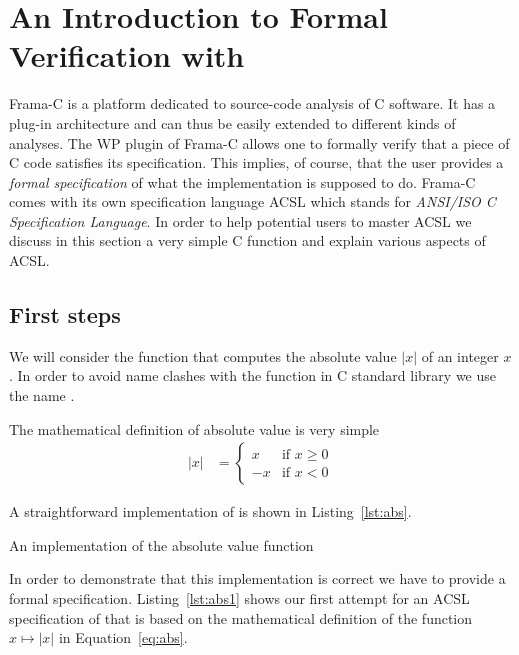 
\section{An Introduction to Formal Verification with \framacwp}
\label{sec:frama-c}

Frama-C is a platform dedicated to source-code analysis of C software.
It has a plug-in architecture and can thus be easily extended to 
different kinds of analyses.
The WP plugin of Frama-C allows one to formally verify that a piece of
C code satisfies its specification.
This implies, of course, that the user provides a \emph{formal specification}
of what the implementation is supposed to do.
Frama-C comes with its own specification language ACSL which stands for
\emph{ANSI\slash ISO C Specification Language}.
In order to help potential users to master ACSL we discuss in this section 
a very simple C function and explain various aspects of ACSL.

\subsection{First steps}

We will consider the function that computes the absolute value $|x|$
of an integer $x$.
In order to avoid name clashes with the function  in C standard library
we use the name .

The mathematical definition of absolute value is very simple
\begin{align}
\label{eq:abs}
   |x| &= \left\{
            \begin{array}{rl}
               x  & \text{if $x \geq 0$} \\
               -x & \text{if $x < 0$}
            \end{array}
          \right.
\end{align}

A straightforward implementation of  is shown in Listing~\ref{lst:abs}.

\begin{listing}[hbt]
\begin{minipage}{\textwidth}

\end{minipage}
\caption{\label{lst:abs} An implementation of the absolute value function}
\end{listing}

In order to demonstrate that this implementation is correct we have to provide
a formal specification.
Listing~\ref{lst:abs1} shows our first attempt for an ACSL specification of  that
is based on the mathematical definition of the function $x \mapsto |x|$ in Equation~\ref{eq:abs}.

